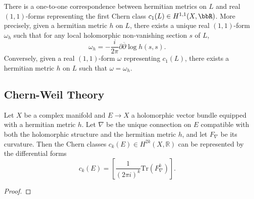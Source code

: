     \begin{proposition}\label{prop:correspondence_between_hermitian_metric_and_forms}
        There is a one-to-one correspondence between hermitian metrics on \(L\) and real \((1,1)\)-forms representing the first Chern class \(c_1(L) \in H^{1,1}(X, \bbR)\).
        More precisely, given a hermitian metric \(h\) on \(L\), there exists a unique real \((1,1)\)-form \(\omega_h\) such that for any local holomorphic non-vanishing section \(s\) of \(L\),
        \[\omega_h = -\frac{i}{2\pi} \partial \overline{\partial} \log h(s,s).\]
        Conversely, given a real \((1,1)\)-form \(\omega\) representing \(c_1(L)\), there exists a hermitian metric \(h\) on \(L\) such that \(\omega = \omega_h\).
    \end{proposition}




\subsection{Chern-Weil Theory}

    \begin{theorem}\label{thm:Chern-Weil_theorem}
        Let \(X\) be a complex manifold and \(E \to X\) a holomorphic vector bundle equipped with a hermitian metric \(h\).
        Let \(\nabla\) be the unique connection on \(E\) compatible with both the holomorphic structure and the hermitian metric \(h\), and let \(F_\nabla\) be its curvature.
        Then the Chern classes \(c_k(E) \in H^{2k}(X, \mathbb{R})\) can be represented by the differential forms
        \[c_k(E) = \left[\frac{1}{(2\pi i)^k} \mathrm{Tr} \left( F_\nabla^k \right) \right].\]
    \end{theorem}
    \begin{proof}
    \end{proof}



